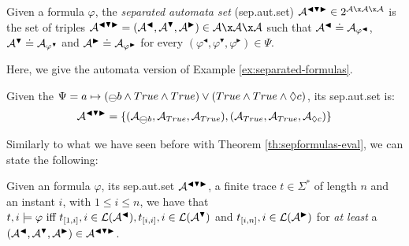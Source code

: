 \begin{definition}\label{def:automaton-eval}
Given a \LTLp formula $\varphi$, the \emph{separated automata set} (sep.aut.set) $\automaton^{\blacktriangleleft \blacktriangledown \blacktriangleright} \in 2^{\automaton \x \automaton \x \automaton}$ is the set of triples $\automaton^{\blacktriangleleft \blacktriangledown \blacktriangleright} = (\automaton^{\blacktriangleleft}, \automaton^{\blacktriangledown}, \automaton^{\blacktriangleright}) \in \automaton \x \automaton \x \automaton$ such that $\mathcal{A}^{\blacktriangleleft} \doteq \mathcal{A}_{\varphi^\blacktriangleleft}$, $\mathcal{A}^{\blacktriangledown} \doteq \mathcal{A}_{\varphi^\blacktriangledown}$ and $\mathcal{A}^{\blacktriangleright} \doteq \mathcal{A}_{\varphi^\blacktriangleright}$ for every $(\varphi^{\blacktriangleleft},\varphi^{\blacktriangledown},\varphi^{\blacktriangleright}) \in \Psi$.
\end{definition}
\noindent Here, we give the automata version of Example \ref{ex:separated-formulas}.
\begin{example}\label{ex:automata-sep-formulas}
Given the \rcon\xspace $\Psi = a \mapsto (\Yesterday b \lAND True \lAND True) \lOR (True \lAND True  \lAND \Diamond c)$, its sep.aut.set is:
\begin{align*}
\automaton^{\blacktriangleleft \blacktriangledown \blacktriangleright} = \{(\automaton_{\Yesterday b}, \automaton_{True}, \automaton_{True}), (\automaton_{True}, \automaton_{True}, \automaton_{\Diamond c})\}
\end{align*}
\end{example}
\noindent Similarly to what we have seen before with Theorem \ref{th:sepformulas-eval}, we can state the following:

\begin{theorem}\citep{cecconi2018interestingness}\label{th:sepautset-eval}
Given an \LTLp formula $\varphi$, its sep.aut.set $\mathcal{A}^{\blacktriangleleft \blacktriangledown \blacktriangleright}$, a finite trace $t \in \Sigma^*$ of length $n$ and an instant $i$, with $1 \le i \le n$, we have that $t,i \models \varphi \ \text{iff}\  t_{[1,i]}, i \in \mathcal{L}(\mathcal{A}^\blacktriangleleft), t_{[i,i]}, i \in \mathcal{L}(\mathcal{A}^\blacktriangledown)$ and $t_{[i,n]}, i \in \mathcal{L}(\mathcal{A}^\blacktriangleright)$ for \emph{at least} a $(\mathcal{A}^{\blacktriangleleft}, \mathcal{A}^{\blacktriangledown}, \mathcal{A}^{\blacktriangleright}) \in \mathcal{A}^{\blacktriangleleft \blacktriangledown \blacktriangleright}$.
\end{theorem}

